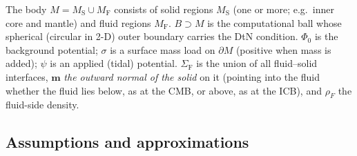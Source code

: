 \documentclass[11pt]{article}
\numberwithin{equation}{section}
\theoremstyle{remark}
\newcommand{\vm}{\mathbf{m}}
\newcommand{\MS}{M_{\mathrm{S}}}
\newcommand{\MF}{M_{\mathrm{F}}}
\newcommand{\SF}{\Sigma_{\mathrm{F}}}
\begin{document}
The body $M = \MS \cup \MF$ consists of solid regions $\MS$ (one or more;
e.g.\ inner core and mantle) and fluid regions $\MF$. $B \supset M$ is the
computational ball whose spherical (circular in 2-D) outer boundary carries
the DtN condition. $\Phi_0$ is the background potential; $\sigma$ is a
surface mass load on $\partial M$ (positive when mass is added); $\psi$ is
an applied (tidal) potential. $\SF$ is the union of all fluid--solid
interfaces, $\vm$ \emph{the outward normal of the solid} on it (pointing
into the fluid whether the fluid lies below, as at the CMB, or above, as at
the ICB), and $\rho_F$ the fluid-side density.

\subsection{Assumptions and approximations}
\label{sec:mixed-assume}
\end{document}
